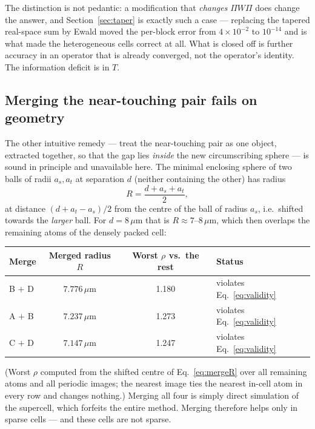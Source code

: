 \documentclass[11pt,a4paper]{article}
\newcommand{\um}{\ensuremath{\,\mu\mathrm{m}}}
\theoremstyle{plain}
\theoremstyle{definition}
\begin{document}
The distinction is not pedantic: a modification that \emph{changes} $\Pi W \Pi$ does
change the answer, and Section~\ref{sec:taper} is exactly such a case ---
replacing the tapered real-space sum by Ewald moved the per-block error from
$4\times10^{-2}$ to $10^{-14}$ and is what made the heterogeneous cells correct
at all. What is closed off is further accuracy in an operator that is already
converged, not the operator's identity. The information deficit is in $T$.

\subsection{Merging the near-touching pair fails on geometry}
\label{sec:merge}

The other intuitive remedy --- treat the near-touching pair as one object,
extracted together, so that the gap lies \emph{inside} the new circumscribing
sphere --- is sound in principle and unavailable here. The minimal enclosing
sphere of two balls of radii $a_s, a_t$ at separation $d$ (neither containing the
other) has radius
\begin{equation}
  R = \frac{d + a_s + a_t}{2},
  \label{eq:mergeR}
\end{equation}
at distance $(d + a_t - a_s)/2$ from the centre of the ball of radius $a_s$, i.e.\
shifted towards the \emph{larger} ball. For $d = 8\um$
that is $R \approx 7$--$8\um$, which then overlaps the remaining atoms of the
densely packed cell:

\begin{center}\small
\begin{tabular}{@{}lccl@{}}
\toprule
Merge & Merged radius $R$ & Worst $\rho$ vs.\ the rest & Status \\
\midrule
B $+$ D & $7.776\um$ & 1.180 & \textcolor{bad}{violates Eq.~\eqref{eq:validity}} \\
A $+$ B & $7.237\um$ & 1.273 & \textcolor{bad}{violates Eq.~\eqref{eq:validity}} \\
C $+$ D & $7.147\um$ & 1.247 & \textcolor{bad}{violates Eq.~\eqref{eq:validity}} \\
\bottomrule
\end{tabular}
\end{center}

\noindent
(Worst $\rho$ computed from the shifted centre of Eq.~\eqref{eq:mergeR} over all
remaining atoms and all periodic images; the nearest image ties the nearest
in-cell atom in every row and changes nothing.) Merging all four is simply direct
simulation of the supercell, which forfeits the entire method. Merging therefore
helps only in sparse cells --- and these cells are not sparse.
\end{document}
